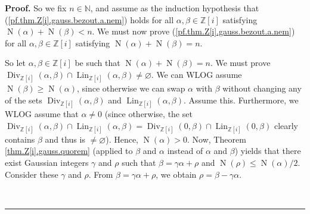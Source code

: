 \documentclass[numbers=enddot,12pt,final,onecolumn,notitlepage]{scrartcl}%
\numberwithin{exer}{subsection}
\theoremstyle{definition}
\newenvironment{proof}[1][Proof]{\noindent\textbf{#1.} }{\ \rule{0.5em}{0.5em}}
\begin{document}
\begin{proof}
So we fix $n\in\mathbb{N}$, and assume as the induction hypothesis that
(\ref{pf.thm.Z[i].gauss.bezout.a.nem}) holds for all $\alpha,\beta
\in\mathbb{Z}\left[  i\right]  $ satisfying $\operatorname*{N}\left(
\alpha\right)  +\operatorname*{N}\left(  \beta\right)  <n$. We must now prove
(\ref{pf.thm.Z[i].gauss.bezout.a.nem}) for all $\alpha,\beta\in\mathbb{Z}%
\left[  i\right]  $ satisfying $\operatorname*{N}\left(  \alpha\right)
+\operatorname*{N}\left(  \beta\right)  =n$.

So let $\alpha,\beta\in\mathbb{Z}\left[  i\right]  $ be such that
$\operatorname*{N}\left(  \alpha\right)  +\operatorname*{N}\left(
\beta\right)  =n$. We must prove $\operatorname*{Div}\nolimits_{\mathbb{Z}%
\left[  i\right]  }\left(  \alpha,\beta\right)  \cap\operatorname*{Lin}%
\nolimits_{\mathbb{Z}\left[  i\right]  }\left(  \alpha,\beta\right)
\neq\varnothing$. We can WLOG assume $\operatorname*{N}\left(  \beta\right)
\geq\operatorname*{N}\left(  \alpha\right)  $, since otherwise we can swap
$\alpha$ with $\beta$ without changing any of the sets $\operatorname*{Div}%
\nolimits_{\mathbb{Z}\left[  i\right]  }\left(  \alpha,\beta\right)  $ and
$\operatorname*{Lin}\nolimits_{\mathbb{Z}\left[  i\right]  }\left(
\alpha,\beta\right)  $. Assume this. Furthermore, we WLOG assume that
$\alpha\neq0$ (since otherwise, the set $\operatorname*{Div}%
\nolimits_{\mathbb{Z}\left[  i\right]  }\left(  \alpha,\beta\right)
\cap\operatorname*{Lin}\nolimits_{\mathbb{Z}\left[  i\right]  }\left(
\alpha,\beta\right)  =\operatorname*{Div}\nolimits_{\mathbb{Z}\left[
i\right]  }\left(  0,\beta\right)  \cap\operatorname*{Lin}%
\nolimits_{\mathbb{Z}\left[  i\right]  }\left(  0,\beta\right)  $ clearly
contains $\beta$ and thus is $\neq\varnothing$). Hence, $\operatorname*{N}%
\left(  \alpha\right)  >0$. Now, Theorem \ref{thm.Z[i].gauss.quorem} (applied
to $\beta$ and $\alpha$ instead of $\alpha$ and $\beta$) yields that there
exist Gaussian integers $\gamma$ and $\rho$ such that $\beta=\gamma\alpha
+\rho$ and $\operatorname*{N}\left(  \rho\right)  \leq\operatorname*{N}\left(
\alpha\right)  /2$. Consider these $\gamma$ and $\rho$. From $\beta
=\gamma\alpha+\rho$, we obtain $\rho=\beta-\gamma\alpha$.


\end{proof}
\end{document}
